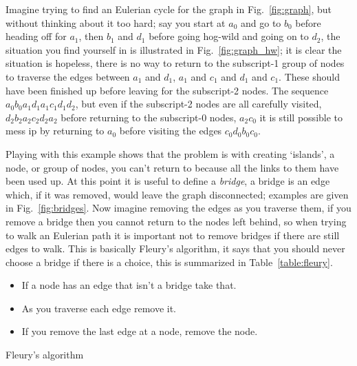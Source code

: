 \documentclass[11pt,a4paper]{scrartcl}
\begin{document}
Imagine trying to find an Eulerian cycle for the graph in
Fig.~\ref{fig:graph}, but without thinking about it too hard; say you
start at $a_0$ and go to $b_0$ before heading off for $a_1$, then
$b_1$ and $d_1$ before going hog-wild and going on to $d_2$, the
situation you find yourself in is illustrated in
Fig.~\ref{fig:graph_hw}; it is clear the situation is hopeless, there
is no way to return to the subscript-1 group of nodes to traverse the
edges between $a_1$ and $d_1$, $a_1$ and $c_1$ and $d_1$ and
$c_1$. These should have been finished up before leaving for the
subscript-2 nodes. The sequence $a_0b_0a_1d_1a_1c_1d_1d_2$, but even
if the subscript-2 nodes are all carefully visited,
$d_2b_2a_2c_2d_2a_2$ before returning to the subscript-0 nodes,
$a_2c_0$ it is still possible to mess ip by returning to $a_0$ before
visiting the edges $c_0d_0b_0c_0$.

Playing with this example shows that the problem is with creating
\lq{}islands\rq{}, a node, or group of nodes, you can't return to
because all the links to them have been used up. At this point it is
useful to define a \textsl{bridge}, a bridge is an edge which, if it
was removed, would leave the graph disconnected; examples are given in
Fig.~\ref{fig:bridges}. Now imagine removing the edges as you traverse
them, if you remove a bridge then you cannot return to the nodes left
behind, so when trying to walk an Eulerian path it is important not to
remove bridges if there are still edges to walk. This is basically
Fleury's algorithm, it says that you should never choose a bridge if
there is a choice, this is summarized in Table~\ref{table:fleury}.

\begin{table}
\begin{itemize}
\item If a node has an edge that isn't a bridge take that.
\item As you traverse each edge remove it.
\item If you remove the last edge at a node, remove the node.
\end{itemize}
\caption{Fleury's algorithm \label{table:fleury}}
\end{table}
  
\end{document}

